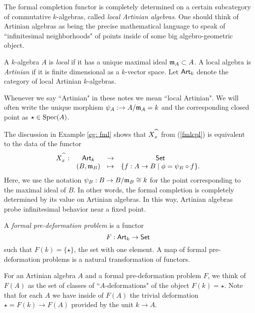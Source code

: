 \documentclass[11pt]{amsart}
\def\Spec{{\rm Spec}}
\begin{document}
The formal completion functor is completely determined on a certain subcategory of commutative $k$-algebras, called {\em local Artinian algebras}.
One should think of Artinian algebras as being the precise mathematical language to speak of ``infinitesimal neighborhoods" of points inside of some big algebro-geometric object. 

\begin{dfn}
A $k$-algebra $A$ is {\em local} if it has a unique maximal ideal $\fm_A \subset A$. 
A local algebra is {\em Artinian} if it is finite dimensional as a $k$-vector space.
Let $\Art_k$ denote the category of local Artinian $k$-algebras.
\end{dfn}

\begin{rmk}
Whenever we say ``Artinian" in these notes we mean ``local Artinian".
We will often write the unique morphism $\psi_A : \to A / \fm_A = k$ and the corresponding closed point as $\star \in \Spec(A)$. 
\end{rmk}

The discussion in Example \ref{eg: fml} shows that $X^{\Hat{\;\;}}_x$ from (\ref{fmlcpl}) is equivalent to the data of the functor
\[
\begin{array}{cccc}
X^{\Hat{\;\;}}_x : & \Art_k & \to & \Set \\
& (B,\fm_B) & \mapsto & \{f : A \to B \; | \; \phi = \psi_B \circ f\} . 
\end{array}
\]
Here, we use the notation $\psi_B : B \to B / \fm_B \cong k$ for the point corresponding to the maximal ideal of $B$. 
In other words, the formal completion is completely determined by its value on Artinian algebras. 
In this way, Artinian algebras probe infinitesimal behavior near a fixed point. 

\begin{dfn}
A {\em formal pre-deformation problem} is a functor
\[
F : \Art_k \to \Set
\]
such that $F(k) = \{\star\}$, the set with one element. 
A map of formal pre-deformation problems is a natural transformation of functors. 
\end{dfn}

For an Artinian algebra $A$ and a formal pre-deformation problem $F$, we think of $F(A)$ as the set of classes of ``$A$-deformations" of the object $F(k) = \star$. 
Note that for each $A$ we have inside of $F(A)$ the trivial deformation $\star = F(k) \to F(A)$ provided by the unit $k \to A$. 
\end{document}
